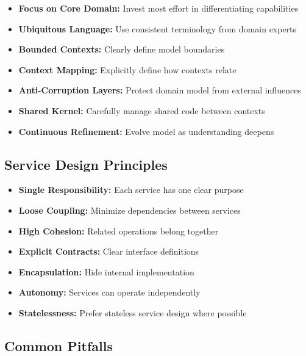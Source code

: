 \documentclass[11pt,letterpaper]{article}
\begin{document}
\begin{domainbox}
\begin{itemize}[nosep]
    \item \textbf{Focus on Core Domain:} Invest most effort in differentiating capabilities
    \item \textbf{Ubiquitous Language:} Use consistent terminology from domain experts
    \item \textbf{Bounded Contexts:} Clearly define model boundaries
    \item \textbf{Context Mapping:} Explicitly define how contexts relate
    \item \textbf{Anti-Corruption Layers:} Protect domain model from external influences
    \item \textbf{Shared Kernel:} Carefully manage shared code between contexts
    \item \textbf{Continuous Refinement:} Evolve model as understanding deepens
\end{itemize}
\end{domainbox}

\subsection{Service Design Principles}

\begin{functionalbox}
\begin{itemize}[nosep]
    \item \textbf{Single Responsibility:} Each service has one clear purpose
    \item \textbf{Loose Coupling:} Minimize dependencies between services
    \item \textbf{High Cohesion:} Related operations belong together
    \item \textbf{Explicit Contracts:} Clear interface definitions
    \item \textbf{Encapsulation:} Hide internal implementation
    \item \textbf{Autonomy:} Services can operate independently
    \item \textbf{Statelessness:} Prefer stateless service design where possible
\end{itemize}
\end{functionalbox}

\subsection{Common Pitfalls}
\end{document}
